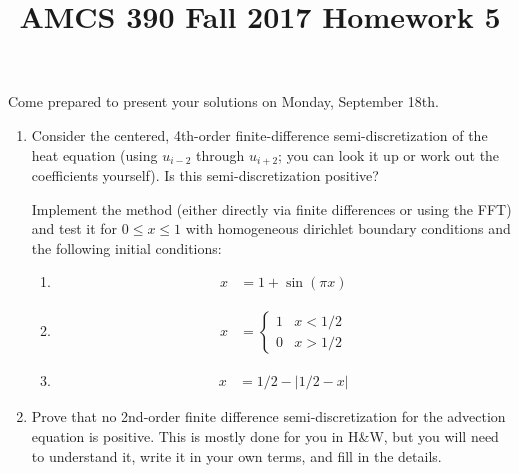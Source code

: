 \documentclass[12pt]{article}
\title{AMCS 390 Fall 2017 Homework 5}
\begin{document}
\date{}
\maketitle

Come prepared to present your solutions on Monday, September 18th.

\begin{enumerate}

    \item Consider the centered, 4th-order finite-difference semi-discretization 
            of the heat equation (using $u_{i-2}$ through $u_{i+2}$; you can look
            it up or work out the coefficients yourself).  Is this semi-discretization
            positive?

            Implement the method (either directly via finite differences or using
            the FFT) and test it for $0 \le x \le 1$ with homogeneous dirichlet
            boundary conditions and the following initial conditions:

            \begin{enumerate}
                \item \begin{align*} x & = 1 + \sin(\pi x) \end{align*}
                \item \begin{align*} x & = \begin{cases} 1 & x<1/2 \\ 0 & x > 1/2 \end{cases} \end{align*}
                \item \begin{align*} x & = 1/2 - |1/2 - x| \end{align*}
            \end{enumerate}

    \item Prove that no 2nd-order finite difference semi-discretization for the advection equation
            is positive.  This is mostly done for you in H\&W, but you will need to understand it,
            write it in your own terms, and fill in the details.
\end{enumerate}
\end{document}
